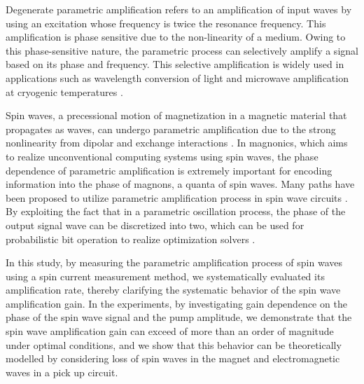 \documentclass[%
 reprint,
 amsmath,amssymb,
 aps,
prb,
]{revtex4-2}
\begin{document}

Degenerate parametric amplification refers to an amplification of input waves by using an excitation whose frequency is twice the resonance frequency. This amplification is phase sensitive due to the non-linearity of a medium. Owing to this phase-sensitive nature, the parametric process can selectively amplify a signal based on its phase and frequency. This selective amplification is widely used in applications such as wavelength conversion of light \cite{Loudon2000,Parker2022,Caves1987} and microwave amplification at cryogenic temperatures \cite{Aumentado2020,Aumentado2022,Yamamoto2008,Yamamoto2016}.

Spin waves, a precessional motion of magnetization in a magnetic material that propagates as waves, can undergo parametric amplification due to the strong nonlinearity from dipolar and exchange interactions \cite{Rez,Brach2016,Brach2017,Makiuchi2021,Serga2003,Melkov1999,Melkov2001}. In magnonics, which aims to realize unconventional computing systems using spin waves, the phase dependence of parametric amplification is extremely important for encoding information into the phase of magnons, a quanta of spin waves. Many paths have been proposed to utilize parametric amplification process in spin wave circuits \cite{Brach2016,Brach2017,Makiuchi2021}.
By exploiting the fact that in a parametric oscillation process, the phase of the output signal wave can be discretized into two, which can be used for probabilistic bit operation to realize optimization solvers \cite{Makiuchi2021,Hioki2021,Elyasi2022,Hioki2022}.

In this study, by measuring the parametric amplification process of spin waves using a spin current measurement method, we systematically evaluated its amplification rate, thereby clarifying the systematic behavior of the spin wave amplification gain. In the experiments, by investigating gain dependence on  the phase of the spin wave signal and the pump amplitude, we demonstrate that the spin wave amplification gain can exceed of more than an order of magnitude under optimal conditions, and we show that this behavior can be theoretically modelled by considering loss of spin waves in the magnet and electromagnetic waves in a pick up circuit.
\end{document}
